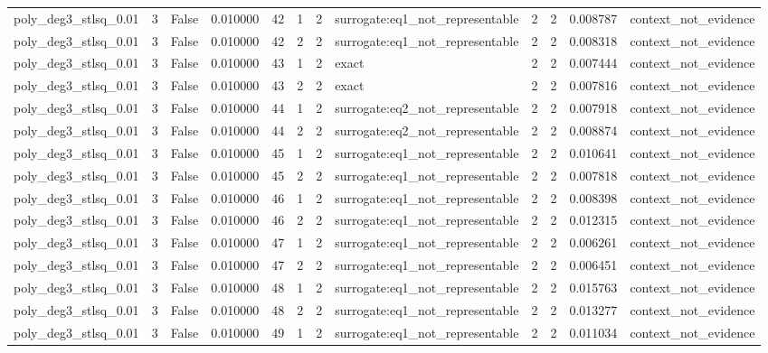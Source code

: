 \begin{tabular}{lrrrrrrlrrrl}
poly\_deg3\_stlsq\_0.01 & 3 & False & 0.010000 & 42 & 1 & 2 & surrogate:eq1\_not\_representable & 2 & 2 & 0.008787 & context\_not\_evidence \\
poly\_deg3\_stlsq\_0.01 & 3 & False & 0.010000 & 42 & 2 & 2 & surrogate:eq1\_not\_representable & 2 & 2 & 0.008318 & context\_not\_evidence \\
poly\_deg3\_stlsq\_0.01 & 3 & False & 0.010000 & 43 & 1 & 2 & exact & 2 & 2 & 0.007444 & context\_not\_evidence \\
poly\_deg3\_stlsq\_0.01 & 3 & False & 0.010000 & 43 & 2 & 2 & exact & 2 & 2 & 0.007816 & context\_not\_evidence \\
poly\_deg3\_stlsq\_0.01 & 3 & False & 0.010000 & 44 & 1 & 2 & surrogate:eq2\_not\_representable & 2 & 2 & 0.007918 & context\_not\_evidence \\
poly\_deg3\_stlsq\_0.01 & 3 & False & 0.010000 & 44 & 2 & 2 & surrogate:eq2\_not\_representable & 2 & 2 & 0.008874 & context\_not\_evidence \\
poly\_deg3\_stlsq\_0.01 & 3 & False & 0.010000 & 45 & 1 & 2 & surrogate:eq1\_not\_representable & 2 & 2 & 0.010641 & context\_not\_evidence \\
poly\_deg3\_stlsq\_0.01 & 3 & False & 0.010000 & 45 & 2 & 2 & surrogate:eq1\_not\_representable & 2 & 2 & 0.007818 & context\_not\_evidence \\
poly\_deg3\_stlsq\_0.01 & 3 & False & 0.010000 & 46 & 1 & 2 & surrogate:eq1\_not\_representable & 2 & 2 & 0.008398 & context\_not\_evidence \\
poly\_deg3\_stlsq\_0.01 & 3 & False & 0.010000 & 46 & 2 & 2 & surrogate:eq1\_not\_representable & 2 & 2 & 0.012315 & context\_not\_evidence \\
poly\_deg3\_stlsq\_0.01 & 3 & False & 0.010000 & 47 & 1 & 2 & surrogate:eq1\_not\_representable & 2 & 2 & 0.006261 & context\_not\_evidence \\
poly\_deg3\_stlsq\_0.01 & 3 & False & 0.010000 & 47 & 2 & 2 & surrogate:eq1\_not\_representable & 2 & 2 & 0.006451 & context\_not\_evidence \\
poly\_deg3\_stlsq\_0.01 & 3 & False & 0.010000 & 48 & 1 & 2 & surrogate:eq1\_not\_representable & 2 & 2 & 0.015763 & context\_not\_evidence \\
poly\_deg3\_stlsq\_0.01 & 3 & False & 0.010000 & 48 & 2 & 2 & surrogate:eq1\_not\_representable & 2 & 2 & 0.013277 & context\_not\_evidence \\
poly\_deg3\_stlsq\_0.01 & 3 & False & 0.010000 & 49 & 1 & 2 & surrogate:eq1\_not\_representable & 2 & 2 & 0.011034 & context\_not\_evidence \\

\end{tabular}

